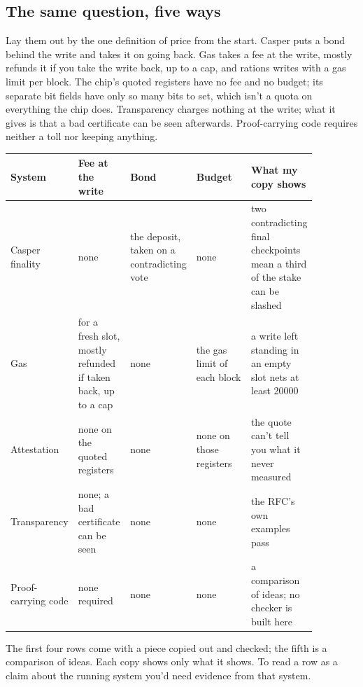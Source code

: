 \documentclass[11pt,twoside]{article}
\theoremstyle{thielethm}
\theoremstyle{thieledef}
\theoremstyle{thieledef}
\theoremstyle{thieledef}
\theoremstyle{thielethm}
\theoremstyle{thieleobs}
\theoremstyle{thielethm}
\begin{document}
\subsection{The same question, five ways}

Lay them out by the one definition of price from the start. Casper puts a bond behind the write and takes it on going back. Gas takes a fee at the write, mostly refunds it if you take the write back, up to a cap, and rations writes with a gas limit per block. The chip's quoted registers have no fee and no budget; its separate bit fields have only so many bits to set, which isn't a quota on everything the chip does. Transparency charges nothing at the write; what it gives is that a bad certificate can be seen afterwards. Proof-carrying code requires neither a toll nor keeping anything.

\begingroup\small
\begin{longtable}{@{}>{\raggedright\arraybackslash}p{0.15\linewidth}>{\raggedright\arraybackslash}p{0.17\linewidth}>{\raggedright\arraybackslash}p{0.16\linewidth}>{\raggedright\arraybackslash}p{0.18\linewidth}>{\raggedright\arraybackslash}p{0.21\linewidth}@{}}
\toprule
\textbf{System} & \textbf{Fee at the write} & \textbf{Bond} & \textbf{Budget} & \textbf{What my copy shows} \\
\midrule
\endhead
\bottomrule
\endlastfoot
Casper finality & none & the deposit, taken on a contradicting vote & none & two contradicting final checkpoints mean a third of the stake can be slashed \\
Gas & 20000 for a fresh slot, mostly refunded if taken back, up to a cap & none & the gas limit of each block & a write left standing in an empty slot nets at least 20000 \\
Attestation & none on the quoted registers & none & none on those registers & the quote can't tell you what it never measured \\
Transparency & none; a bad certificate can be seen & none & none & the RFC's own examples pass \\
Proof-carrying code & none required & none & none & a comparison of ideas; no checker is built here \\
\end{longtable}
\endgroup

The first four rows come with a piece copied out and checked; the fifth is a comparison of ideas. Each copy shows only what it shows. To read a row as a claim about the running system you'd need evidence from that system.
\end{document}
